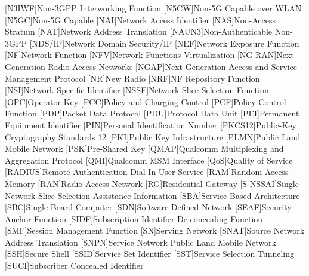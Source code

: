 \begin{multicols}{2}
\begin{acronym}[WPA]
        [N3IWF]{Non-3GPP Interworking Function}
        [N5CW]{Non-5G Capable over WLAN}
        [N5GC]{Non-5G Capable}
        [NAI]{Network Access Identifier}
        [NAS]{Non-Access Stratum}
        [NAT]{Network Address Translation}
        [NAUN3]{Non-Authenticable Non-3GPP}
        [NDS/IP]{Network Domain Security/IP}
        [NEF]{Network Exposure Function}
        [NF]{Network Function}
        [NFV]{Network Functions Virtualization}
        [NG-RAN]{Next Generation Radio Access Networks}
        [NGAP]{Next Generation Access and Service Management Protocol}
        [NR]{New Radio}
        [NRF]{NF Repository Function}
        [NSI]{Network Specific Identifier}
        [NSSF]{Network Slice Selection Function}
        [OPC]{Operator Key}
        [PCC]{Policy and Charging Control}
        [PCF]{Policy Control Function}
        [PDP]{Packet Data Protocol}
        [PDU]{Protocol Data Unit}
        [PEI]{Permanent Equipment Identifier}
        [PIN]{Personal Identification Number}
        [PKCS12]{Public-Key Cryptography Standards 12}
        [PKI]{Public Key Infrastructure}
        [PLMN]{Public Land Mobile Network}
        [PSK]{Pre-Shared Key}
        [QMAP]{Qualcomm Multiplexing and Aggregation Protocol}
        [QMI]{Qualcomm MSM Interface}
        [QoS]{Quality of Service}
        [RADIUS]{Remote Authentication Dial-In User Service}
        [RAM]{Random Access Memory}
        [RAN]{Radio Access Network}
        [RG]{Residential Gateway}
        [S-NSSAI]{Single Network Slice Selection Assistance Information}
        [SBA]{Service Based Architecture}
        [SBC]{Single Board Computer}
        [SDN]{Software Defined Network}
        [SEAF]{Security Anchor Function}
        [SIDF]{Subscription Identifier De-concealing Function}
        [SMF]{Session Management Function}
        [SN]{Serving Network}
        [SNAT]{Source Network Address Translation}
        [SNPN]{Service Network Public Land Mobile Network}
        [SSH]{Secure Shell}
        [SSID]{Service Set Identifier}
        [SST]{Service Selection Tunneling}
        [SUCI]{Subscriber Concealed Identifier}

\end{acronym}
\end{multicols}
